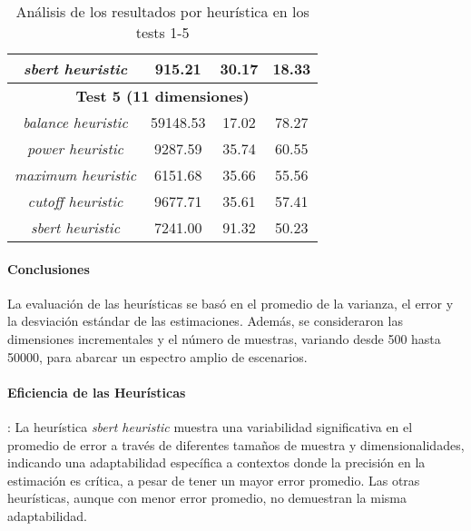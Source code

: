 \documentclass{article}
\begin{document}
\begin{table}[H]
{\begin{tabular}{|c|c|c|c|}
\textit{sbert heuristic} & 915.21 & 30.17 & 18.33 \\ \hline
\multicolumn{4}{|c|}{\textbf{Test 5 (11 dimensiones)}} \\ \hline
\textit{balance heuristic} & 59148.53 & 17.02 & 78.27 \\ \hline
\textit{power heuristic} & 9287.59 & 35.74 & 60.55 \\ \hline
\textit{maximum heuristic} & 6151.68 & 35.66 & 55.56 \\ \hline
\textit{cutoff heuristic} & 9677.71 & 35.61 & 57.41 \\ \hline
\textit{sbert heuristic} & 7241.00 & 91.32 & 50.23 \\ \hline
\end{tabular}%
}
\caption{Análisis de los resultados por heurística en los tests 1-5}
\end{table}

\begin{table}[H]
\centering
\label{table:heuristic_analysis}
\caption{Análisis de los resultados por heurística}
\end{table}

\paragraph{Conclusiones}
La evaluación de las heurísticas se basó en el promedio de la varianza, el error y la desviación estándar de las estimaciones.
Además, se consideraron las dimensiones incrementales y el número de muestras, variando desde 500 hasta 50000, para abarcar un espectro amplio de escenarios.

\paragraph{Eficiencia de las Heurísticas}: La heurística \textit{sbert heuristic} muestra una variabilidad significativa en el promedio de error a través de diferentes tamaños de muestra y dimensionalidades, indicando una adaptabilidad específica a contextos donde la precisión en la estimación es crítica, a pesar de tener un mayor error promedio. Las otras heurísticas, aunque con menor error promedio, no demuestran la misma adaptabilidad.
\end{document}
